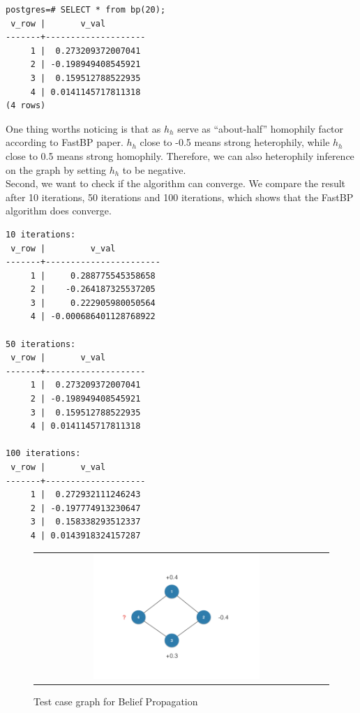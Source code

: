 \begin{verbatim}
postgres=# SELECT * from bp(20);
 v_row |       v_val        
-------+--------------------
     1 |  0.273209372007041
     2 | -0.198949408545921
     3 |  0.159512788522935
     4 | 0.0141145717811318
(4 rows)
\end{verbatim}

One thing worths noticing is that as $h_h$ serve as “about-half” homophily factor according to FastBP paper\cite{koutra2011unifying}. $h_h$ close to -0.5 means strong heterophily, while $h_h$ close to 0.5 means strong homophily. Therefore, we can also heterophily inference on the graph by setting $h_h$ to be negative.\\
Second, we want to check if the algorithm can converge. We compare the result after 10 iterations, 50 iterations and 100 iterations, which shows that the FastBP algorithm does converge.

\begin{verbatim}
10 iterations:
 v_row |         v_val         
-------+-----------------------
     1 |     0.288775545358658
     2 |    -0.264187325537205
     3 |     0.222905980050564
     4 | -0.000686401128768922

50 iterations:
 v_row |       v_val        
-------+--------------------
     1 |  0.273209372007041
     2 | -0.198949408545921
     3 |  0.159512788522935
     4 | 0.0141145717811318

100 iterations:
 v_row |       v_val        
-------+--------------------
     1 |  0.272932111246243
     2 | -0.197774913230647
     3 |  0.158338293512337
     4 | 0.0143918324157287
\end{verbatim}

\begin{figure}[htbf]
\begin{center}
\begin{tabular}{cc}
     \includegraphics[width=0.6\textwidth]{FIG/task6.png} \\
\end{tabular}
\caption{Test case graph for Belief Propagation}
\label{fig:results6}
\end{center}
\end{figure}

